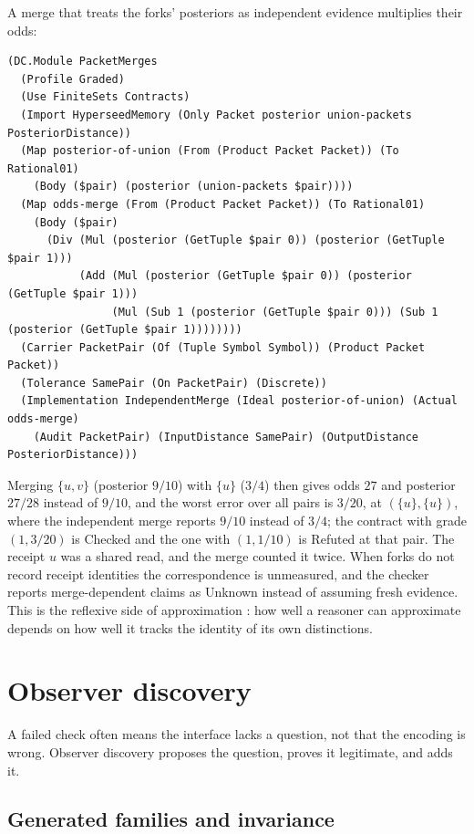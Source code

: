 \documentclass[11pt]{article}
\theoremstyle{definition}
\theoremstyle{plain}
\begin{document}
A merge that treats the forks' posteriors as independent evidence multiplies their odds:
\begin{lstlisting}[basicstyle=\ttfamily\footnotesize,title={\scriptsize\ttfamily fixtures/receipt\_packets.metta}]
(DC.Module PacketMerges
  (Profile Graded)
  (Use FiniteSets Contracts)
  (Import HyperseedMemory (Only Packet posterior union-packets PosteriorDistance))
  (Map posterior-of-union (From (Product Packet Packet)) (To Rational01)
    (Body ($pair) (posterior (union-packets $pair))))
  (Map odds-merge (From (Product Packet Packet)) (To Rational01)
    (Body ($pair)
      (Div (Mul (posterior (GetTuple $pair 0)) (posterior (GetTuple $pair 1)))
           (Add (Mul (posterior (GetTuple $pair 0)) (posterior (GetTuple $pair 1)))
                (Mul (Sub 1 (posterior (GetTuple $pair 0))) (Sub 1 (posterior (GetTuple $pair 1))))))))
  (Carrier PacketPair (Of (Tuple Symbol Symbol)) (Product Packet Packet))
  (Tolerance SamePair (On PacketPair) (Discrete))
  (Implementation IndependentMerge (Ideal posterior-of-union) (Actual odds-merge)
    (Audit PacketPair) (InputDistance SamePair) (OutputDistance PosteriorDistance)))
\end{lstlisting}
Merging $\{u,v\}$ (posterior $9/10$) with $\{u\}$ ($3/4$) then gives odds $27$ and posterior $27/28$
instead of $9/10$, and the worst error over all pairs is $3/20$, at $(\{u\},\{u\})$, where the
independent merge reports $9/10$ instead of $3/4$; the contract with grade $(1,3/20)$ is Checked and
the one with $(1,1/10)$ is Refuted at that pair. The receipt $u$ was a shared read, and the merge
counted it twice. When forks do not record receipt identities the correspondence is unmeasured, and
the checker reports merge-dependent claims as Unknown instead of assuming fresh evidence. This is
the reflexive side of approximation \cite{aat,plnoverlap}: how well a reasoner can approximate
depends on how well it tracks the identity of its own distinctions.

\section{Observer discovery}\label{sec:discovery}

A failed check often means the interface lacks a question, not that the encoding is wrong. Observer
discovery proposes the question, proves it legitimate, and adds it.

\subsection{Generated families and invariance}
\end{document}
